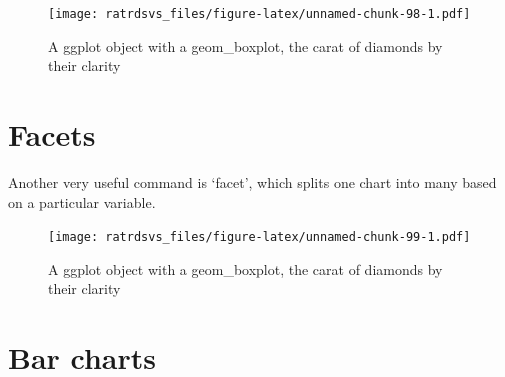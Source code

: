 \documentclass[
]{book}
\newenvironment{Shaded}{\begin{snugshade}}{\end{snugshade}}
\newcommand{\DataTypeTok}[1]{\textcolor[rgb]{0.13,0.29,0.53}{#1}}
\newcommand{\KeywordTok}[1]{\textcolor[rgb]{0.13,0.29,0.53}{\textbf{#1}}}
\newcommand{\NormalTok}[1]{#1}
\newcommand{\OperatorTok}[1]{\textcolor[rgb]{0.81,0.36,0.00}{\textbf{#1}}}
\newcommand{\StringTok}[1]{\textcolor[rgb]{0.31,0.60,0.02}{#1}}
\begin{document}
\begin{figure}
\centering
\texttt{[image: ratrdsvs\_files/figure-latex/unnamed-chunk-98-1.pdf]}
\caption{\label{fig:unnamed-chunk-98}A ggplot object with a geom\_boxplot, the carat of diamonds by their clarity}
\end{figure}

\hypertarget{gg_facets}{%
\section{Facets}\label{gg_facets}}

Another very useful command is `facet', which splits one chart into many based on a particular variable.

\begin{Shaded}
\end{Shaded}

\begin{figure}
\centering
\texttt{[image: ratrdsvs\_files/figure-latex/unnamed-chunk-99-1.pdf]}
\caption{\label{fig:unnamed-chunk-99}A ggplot object with a geom\_boxplot, the carat of diamonds by their clarity}
\end{figure}

\hypertarget{gg_bars}{%
\section{Bar charts}\label{gg_bars}}
\end{document}
